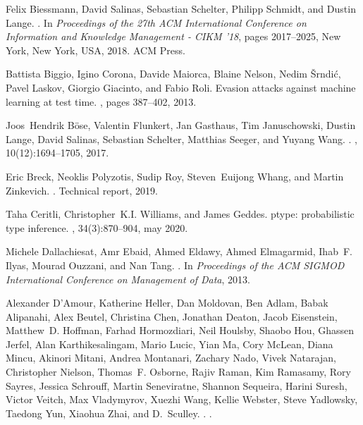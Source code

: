\documentclass[11pt]{article}
\begin{document}
\begin{thebibliography}{10}
Felix Biessmann, David Salinas, Sebastian Schelter, Philipp Schmidt, and Dustin
  Lange.
.
\newblock In {\em Proceedings of the 27th ACM International Conference on
  Information and Knowledge Management - CIKM '18}, pages 2017--2025, New York,
  New York, USA, 2018. ACM Press.

Battista Biggio, Igino Corona, Davide Maiorca, Blaine Nelson, Nedim {\v
  S}rndi{\'c}, Pavel Laskov, Giorgio Giacinto, and Fabio Roli.
\newblock Evasion attacks against machine learning at test time.
, pages 387--402, 2013.

Joos~Hendrik B{\"{o}}se, Valentin Flunkert, Jan Gasthaus, Tim Januschowski,
  Dustin Lange, David Salinas, Sebastian Schelter, Matthias Seeger, and Yuyang
  Wang.
.
, 10(12):1694--1705, 2017.

Eric Breck, Neoklis Polyzotis, Sudip Roy, Steven~Euijong Whang, and Martin
  Zinkevich.
.
\newblock Technical report, 2019.

Taha Ceritli, Christopher~K.I. Williams, and James Geddes.
\newblock ptype: probabilistic type inference.
, 34(3):870--904, may 2020.

Michele Dallachiesat, Amr Ebaid, Ahmed Eldawy, Ahmed Elmagarmid, Ihab~F. Ilyas,
  Mourad Ouzzani, and Nan Tang.
.
\newblock In {\em Proceedings of the ACM SIGMOD International Conference on
  Management of Data}, 2013.

Alexander D'Amour, Katherine Heller, Dan Moldovan, Ben Adlam, Babak Alipanahi,
  Alex Beutel, Christina Chen, Jonathan Deaton, Jacob Eisenstein, Matthew~D.
  Hoffman, Farhad Hormozdiari, Neil Houlsby, Shaobo Hou, Ghassen Jerfel, Alan
  Karthikesalingam, Mario Lucic, Yian Ma, Cory McLean, Diana Mincu, Akinori
  Mitani, Andrea Montanari, Zachary Nado, Vivek Natarajan, Christopher Nielson,
  Thomas~F. Osborne, Rajiv Raman, Kim Ramasamy, Rory Sayres, Jessica Schrouff,
  Martin Seneviratne, Shannon Sequeira, Harini Suresh, Victor Veitch, Max
  Vladymyrov, Xuezhi Wang, Kellie Webster, Steve Yadlowsky, Taedong Yun,
  Xiaohua Zhai, and D.~Sculley.
.
.


\end{thebibliography}
\end{document}
